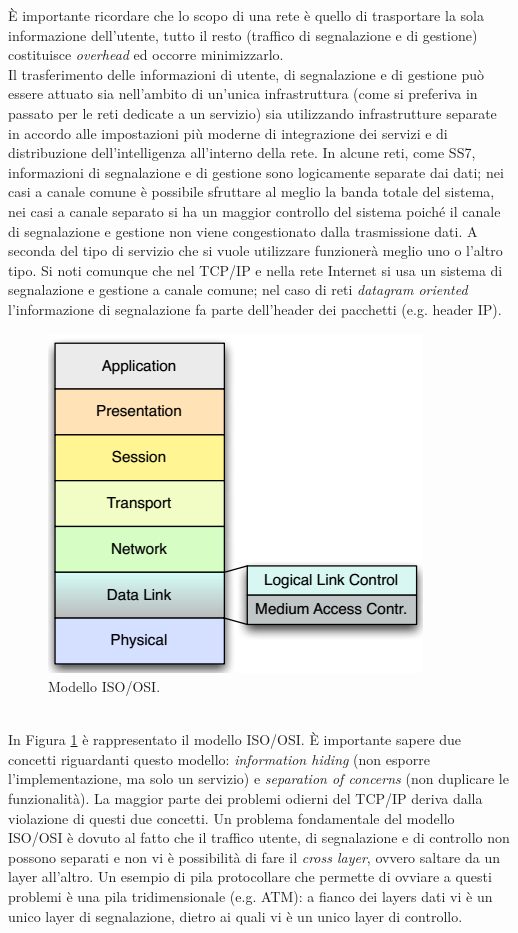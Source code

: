 È importante ricordare che lo scopo di una rete è quello di trasportare la sola informazione dell'utente, tutto il resto (traffico di segnalazione e di gestione) costituisce \textit{overhead} ed occorre minimizzarlo.\\
Il trasferimento delle informazioni di utente, di segnalazione e di gestione può essere attuato sia nell'ambito di un'unica infrastruttura (come si preferiva in passato per le reti dedicate a un servizio) sia utilizzando infrastrutture separate in accordo alle impostazioni più moderne di integrazione dei servizi e di distribuzione dell'intelligenza all'interno della rete. In alcune reti, come SS7, informazioni di segnalazione e di gestione sono logicamente separate dai dati; nei casi a canale comune è possibile sfruttare al meglio la banda totale del sistema, nei casi a canale separato si ha un maggior controllo del sistema poiché il canale di segnalazione e gestione non viene congestionato dalla trasmissione dati. A seconda del tipo di servizio che si vuole utilizzare funzionerà meglio uno o l'altro tipo. Si noti comunque che nel TCP/IP e nella rete Internet si usa un sistema di segnalazione e gestione a canale comune; nel caso di reti \textit{datagram oriented} l'informazione di segnalazione fa parte dell'header dei pacchetti (e.g. header IP).
\begin{figure}[htbp]
	\centering
	\includegraphics[scale = 0.55]{images/ISO-OSI}
	\caption{Modello ISO/OSI.}
	\label{img:ISO-OSI}
\end{figure}\\
In Figura \ref{img:ISO-OSI} è rappresentato il modello ISO/OSI. È importante sapere due concetti riguardanti questo modello: \textit{information hiding} (non esporre l'implementazione, ma solo un servizio) e \textit{separation of concerns} (non duplicare le funzionalità). La maggior parte dei problemi odierni del TCP/IP deriva dalla violazione di questi due concetti. Un problema fondamentale del modello ISO/OSI è dovuto al fatto che il traffico utente, di segnalazione e di controllo non possono separati e non vi è possibilità di fare il \textit{cross layer}, ovvero saltare da un layer all'altro. Un esempio di pila protocollare che permette di ovviare a questi problemi è una pila tridimensionale (e.g. ATM): a fianco dei layers dati vi è un unico layer di segnalazione, dietro ai quali vi è un unico layer di controllo.\\
